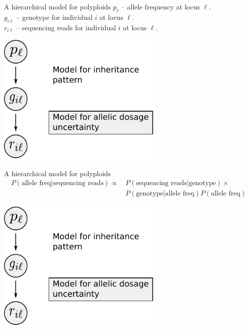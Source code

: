 \documentclass[presentation]{beamer}
\begin{document}
\begin{frame}[c]{A hierarchical model for polyploids}
	$p_{\ell}$ -- allele frequency at locus $\ell$. \\
	$g_{i \ell}$ -- genotype for individual $i$ at locus $\ell$. \\
	$r_{i \ell}$ -- sequencing reads for individual $i$ at locus $\ell$.
	\vspace{0.1in}
	\begin{center}
		\includegraphics[width=0.6\textwidth]{fig/figure1-model-graph}
	\end{center}
\end{frame}

\begin{frame}[t]{A hierarchical model for polyploids}
	\fontsize{10pt}{10}\selectfont
	\vspace{-0.0375in}
	\begin{align*}
		P(\text{allele freq} \vert \text{sequencing reads}) \propto\, &P(\text{sequencing reads} \vert \text{genotype}) \times\\
		&P(\text{genotype} \vert \text{allele freq})P(\text{allele freq})
	\end{align*}
		
	\begin{center}
		\includegraphics[width=0.6\textwidth]{fig/figure1-model-graph}
	\end{center}
\end{frame}
\end{document}
